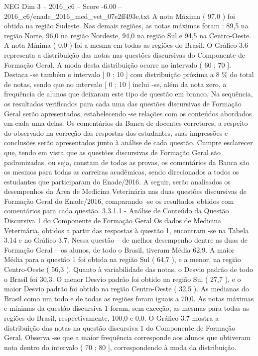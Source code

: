 \begin{textsample}{NEG Dim 3 – 2016\_c6 – Score -6.00 – 2016\_c6/enade\_2016\_med\_vet\_07e2ff493e.txt}
A nota Máxima ( 97,0 ) foi obtida na região Sudeste.
Nas demais regiões, as notas máximas foram : 89,5 na região Norte, 96,0 na região Nordeste, 94,0 na região Sul e 94,5 na Centro-Oeste.
A nota Mínima ( 0,0 ) foi a mesma em todas as regiões do Brasil.
O Gráfico 3.6 representa a distribuição das notas nas questões discursivas do Componente de Formação Geral.
A moda desta distribuição ocorre no intervalo ( 60 ; 70 ].
Destaca -se também o intervalo [ 0 ; 10 ] com distribuição próxima a 8 \% do total de notas, sendo que no intervalo [ 0 ; 10 ] inclui -se, além da nota zero, a frequência de alunos que deixaram este tipo de questão em branco.
Na sequência, os resultados verificados para cada uma das questões discursivas de Formação Geral serão apresentados, estabelecendo -se relações com os conteúdos abordados em cada uma delas.
Os comentários da Banca de docentes corretores, a respeito do observado na correção das respostas dos estudantes, suas impressões e conclusões serão apresentados junto à análise de cada questão.
Cumpre esclarecer que, tendo em vista que as questões discursivas de Formação Geral são padronizadas, ou seja, constam de todas as provas, os comentários da Banca são os mesmos para todas as carreiras acadêmicas, sendo direcionados a todos os estudantes que participaram do Enade/2016.
A seguir, serão analisados os desempenhos da Área de Medicina Veterinária nas duas questões discursivas de Formação Geral do Enade/2016, comparando -se os resultados obtidos com comentários para cada questão. 3.3.1.1 - Análise de Conteúdo da Questão Discursiva 1 do Componente de Formação Geral Os dados de Medicina Veterinária, obtidos a partir das respostas à questão 1, encontram -se na Tabela 3.14 e no Gráfico 3.7.
Nessa questão – de melhor desempenho dentre as duas de Formação Geral – os alunos, de todo o Brasil, tiveram Média 62,9.
A maior Média para a questão 1 foi obtida na região Sul ( 64,7 ), e a menor, na região Centro-Oeste ( 56,3 ).
Quanto à variabilidade das notas, o Desvio padrão de todo o Brasil foi 30,3.
O menor Desvio padrão foi obtido na região Sul ( 27,7 ), e o maior Desvio padrão foi obtido na região Centro-Oeste ( 32,5 ).
As medianas do Brasil como um todo e de todas as regiões foram iguais a 70,0.
As notas máximas e mínimas da questão discursiva 1 foram, sem exceção, as mesmas para todas as regiões do Brasil, respectivamente, 100,0 e 0,0.
O Gráfico 3.7 mostra a distribuição das notas na questão discursiva 1 do Componente de Formação Geral.
Observa -se que a maior frequência corresponde aos alunos que obtiveram nota dentro do intervalo ( 70 ; 80 ], correspondendo à moda da distribuição.

\end{textsample}

